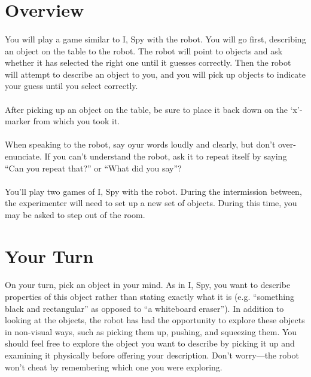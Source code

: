 \documentclass{article}
\begin{document}
\section{Overview}

\paragraph{} You will play a game similar to I, Spy with the robot. You will go first, describing an object on the table to the robot. The robot will point to objects and ask whether it has selected the right one until it guesses correctly. Then the robot will attempt to describe an object to you, and you will pick up objects to indicate your guess until you select correctly.

\paragraph{} After picking up an object on the table, be sure to place it back down on the `x'-marker from which you took it.

\paragraph{} When speaking to the robot, say oyur words loudly and clearly, but don't over-enunciate. If you can't understand the robot, ask it to repeat itself by saying ``Can you repeat that?'' or ``What did you say''?

\paragraph{} You'll play two games of I, Spy with the robot. During the intermission between, the experimenter will need to set up a new set of objects. During this time, you may be asked to step out of the room.

\section{Your Turn}

\paragraph{} On your turn, pick an object in your mind. As in I, Spy, you want to describe properties of this object rather than stating exactly what it is (e.g. ``something black and rectangular'' as opposed to ``a whiteboard eraser''). In addition to looking at the objects, the robot has had the opportunity to explore these objects in non-visual ways, such as picking them up, pushing, and squeezing them. You should feel free to explore the object you want to describe by picking it up and examining it physically before offering your description. Don't worry---the robot won't cheat by remembering which one you were exploring.
\end{document}
